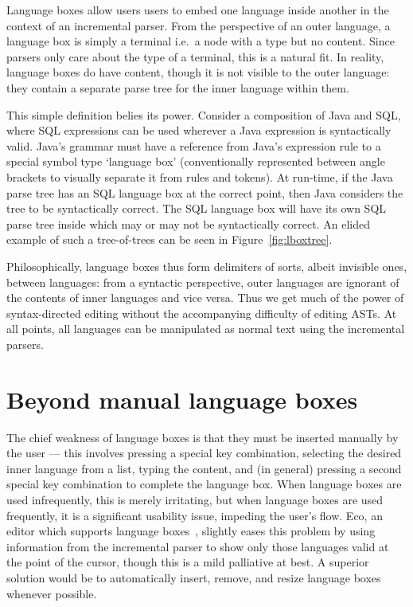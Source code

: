 \documentclass[sigplan,screen]{acmart}\settopmatter{printfolios=true,printccs=false,printacmref=false}
\begin{document}
Language boxes allow users users to embed one language inside another in the
context of an incremental parser. From the perspective of an outer language, a
language box is simply a terminal i.e.~a node with a type but no content. Since
parsers only care about the type of a terminal, this is a natural fit. In
reality, language boxes do have content, though it is not visible to the outer
language: they contain a separate parse tree for the inner language within
them.

This simple definition belies its power. Consider a composition of Java and
SQL, where SQL expressions can be used wherever a Java expression is
syntactically valid. Java's grammar must have a reference from Java's
expression rule to a special symbol type `language box' (conventionally
represented between angle brackets to visually separate it from rules and
tokens). At run-time, if the Java parse tree has an SQL language box at the
correct point, then Java considers the tree to be syntactically correct. The
SQL language box will have its own SQL parse tree inside which may or may not
be syntactically correct. An elided example of such a tree-of-trees can be seen
in Figure~\ref{fig:lboxtree}.

Philosophically, language boxes thus form delimiters of sorts, albeit invisible
ones, between languages: from a syntactic perspective, outer languages are
ignorant of the contents of inner languages and vice versa. Thus we get much of
the power of syntax-directed editing without the accompanying difficulty of
editing ASTs. At all points, all languages can be manipulated as normal text
using the incremental parsers.


\section{Beyond manual language boxes}

\label{the problem}
The chief weakness of language boxes is that they must be inserted
manually by the user --- this involves pressing a special key combination,
selecting the desired inner language from a list, typing the content, and (in
general) pressing a second special key combination to complete the language box.
When language boxes are used infrequently, this is merely irritating,
but when language boxes are used frequently, it is a significant usability
issue, impeding the user's flow. Eco, an editor which supports language boxes~\cite{diekmann14eco},
slightly eases this problem by using information from the incremental parser to
show only those languages valid at the point of the cursor,
though this is a mild palliative at best. A superior solution would be
to automatically insert, remove, and resize language boxes whenever possible.
\end{document}
